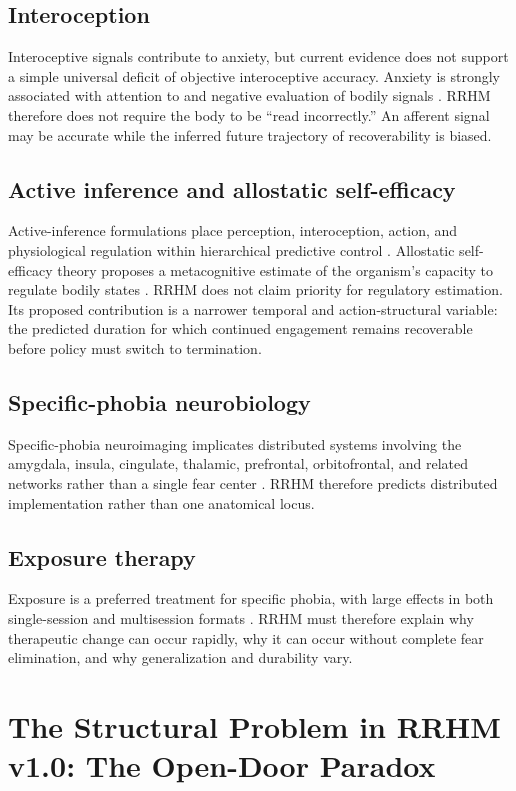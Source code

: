 \documentclass[11pt]{article}
\begin{document}
\subsection{Interoception}
Interoceptive signals contribute to anxiety, but current evidence does not support a simple universal deficit of objective interoceptive accuracy. Anxiety is strongly associated with attention to and negative evaluation of bodily signals \cite{jenkinson2024,clemente2024}. RRHM therefore does not require the body to be ``read incorrectly.'' An afferent signal may be accurate while the inferred future trajectory of recoverability is biased.

\subsection{Active inference and allostatic self-efficacy}
Active-inference formulations place perception, interoception, action, and physiological regulation within hierarchical predictive control \cite{paulus2019}. Allostatic self-efficacy theory proposes a metacognitive estimate of the organism's capacity to regulate bodily states \cite{stephan2016}. RRHM does not claim priority for regulatory estimation. Its proposed contribution is a narrower temporal and action-structural variable: the predicted duration for which continued engagement remains recoverable before policy must switch to termination.

\subsection{Specific-phobia neurobiology}
Specific-phobia neuroimaging implicates distributed systems involving the amygdala, insula, cingulate, thalamic, prefrontal, orbitofrontal, and related networks rather than a single fear center \cite{linares2012,etkin2007}. RRHM therefore predicts distributed implementation rather than one anatomical locus.

\subsection{Exposure therapy}
Exposure is a preferred treatment for specific phobia, with large effects in both single-session and multisession formats \cite{odgers2022}. RRHM must therefore explain why therapeutic change can occur rapidly, why it can occur without complete fear elimination, and why generalization and durability vary.

\section{The Structural Problem in RRHM v1.0: The Open-Door Paradox}
\end{document}
